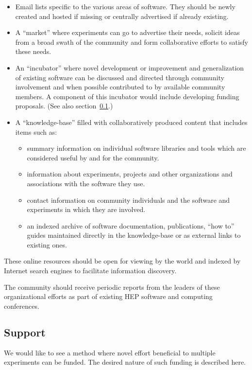 \begin{itemize}
\item Email lists specific to the various areas of software.  They should be
  newly created and hosted if missing or centrally advertised if already existing.
\item A ``market'' where experiments can go to advertise their needs,
  solicit ideas from a broad swath of the community and form 
  collaborative efforts to satisfy these needs.
\item An ``incubator'' where novel development or improvement and
  generalization of existing software can be discussed and directed
  through community involvement and when possible contributed to by
  available community members.  A component of this incubator would
  include developing funding proposals.  (See also section~\ref{sec:support}.)
\item A ``knowledge-base'' filled with collaboratively produced content
  that includes items such as:
  \begin{itemize}
  \item summary information on individual software libraries and tools
    which are considered useful by and for the community.
  \item information about experiments, projects and other
    organizations and associations with the software they use.
  \item contact information on community individuals and the software
    and experiments in which they are involved.
  \item an indexed archive of software documentation, publications,
    ``how to'' guides maintained directly in the knowledge-base or 
    as external links to existing ones.
  \end{itemize}
\end{itemize}

\noindent These online resources should be open for viewing by the world and
indexed by Internet search engines to facilitate information
discovery.

The community should receive periodic reports from the leaders of
these organizational efforts as part of existing HEP software and
computing conferences.


\subsection{Support}
\label{sec:support}

We would like to see a method where novel effort beneficial to
multiple experiments can be funded.  The desired nature of such
funding is described here.

